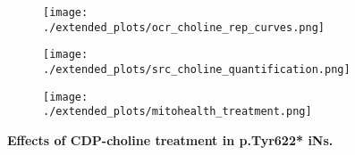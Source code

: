 \begin{figure}[H]
\begin{subfigure}[t]{.25\textwidth}
        \caption{}
        \texttt{[image: ./extended\_plots/ocr\_choline\_rep\_curves.png]}        
    \end{subfigure}
    \begin{subfigure}[t]{.22\textwidth}
        \caption{}
        \texttt{[image: ./extended\_plots/src\_choline\_quantification.png]}        
    \end{subfigure}
    \hspace{.25cm}
    \begin{subfigure}[t]{.45\textwidth}
        \caption{}
        \texttt{[image: ./extended\_plots/mitohealth\_treatment.png]}        
    \end{subfigure}
    \caption{
         \textbf{Effects of CDP-choline treatment in p.Tyr622* iNs.}\\
     }
     \label{fig:choline_treatment}
\end{figure}
